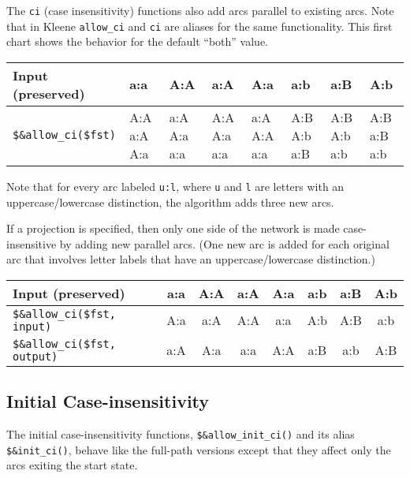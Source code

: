 \documentclass[letterpaper,12pt]{article}
\begin{document}
The \verb!ci! (case insensitivity) functions also add arcs parallel to existing arcs.
Note that in Kleene \verb!allow_ci! and \verb!ci! are aliases for the same
functionality.  This first chart shows the behavior for the default ``both''
value.

\vspace{.5cm}
\noindent
\begin{tabular}{|l|p{.7cm}|p{.7cm}|p{.7cm}|p{.7cm}|p{.7cm}|p{.7cm}|p{.7cm}|}
\hline
Input   (preserved)      & a:a         & A:A         & a:A         & A:a         & a:b                  & a:B         & A:b \\
\hline
\verb/$&allow_ci($fst)/  & A:A a:A A:a & a:A A:a a:a & A:A A:a a:a & a:A A:A a:a & A:B
A:b a:B & A:B A:b a:b & A:B a:B a:b\\
\hline
\end{tabular}
\vspace{.5cm}

\noindent
Note that for every arc labeled \texttt{u:l}, where \texttt{u} and \texttt{l} are
letters with an uppercase/lowercase distinction, the algorithm adds three new arcs.


If a projection is specified, then only one side of the network is made
case-insensitive by adding new parallel arcs.  (One new arc is added for each
original arc that involves letter labels that have an uppercase/lowercase
distinction.)

\vspace{.5cm}
\noindent
\begin{tabular}{|l|c|c|c|c|c|c|c|}
\hline
Input (preserved)               & a:a & A:A & a:A & A:a & a:b & a:B & A:b \\
\hline
\verb/$&allow_ci($fst, input)/  & A:a & a:A & A:A & a:a & A:b & A:B & a:b \\
\hline
\verb/$&allow_ci($fst, output)/  & a:A & A:a & a:a & A:A & a:B & a:b & A:B \\
\hline
\end{tabular}
\vspace{.5cm}

\subsection{Initial Case-insensitivity}

The initial case-insensitivity functions, \verb!$&allow_init_ci()! and its
alias \verb!$&init_ci()!, behave like the full-path versions except that
they affect only the arcs exiting the start state.
\end{document}
